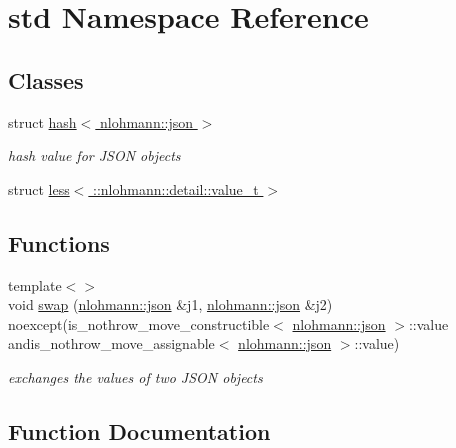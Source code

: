 \hypertarget{namespacestd}{}\section{std Namespace Reference}
\label{namespacestd}
\subsection*{Classes}
\begin{DoxyCompactItemize}
\item 
struct \hyperlink{structstd_1_1hash_3_01nlohmann_1_1json_01_4}{hash$<$ nlohmann\+::json $>$}
\begin{DoxyCompactList}\small\item\em hash value for J\+S\+ON objects \end{DoxyCompactList}\item 
struct \hyperlink{structstd_1_1less_3_01_1_1nlohmann_1_1detail_1_1value__t_01_4}{less$<$ \+::nlohmann\+::detail\+::value\+\_\+t $>$}
\end{DoxyCompactItemize}
\subsection*{Functions}
\begin{DoxyCompactItemize}
\item 
{\footnotesize template$<$$>$ }\\void \hyperlink{namespacestd_a248fd91b080106301215d145dd58cd9d}{swap} (\hyperlink{namespacenlohmann_a2bfd99e845a2e5cd90aeaf1b1431f474}{nlohmann\+::json} \&j1, \hyperlink{namespacenlohmann_a2bfd99e845a2e5cd90aeaf1b1431f474}{nlohmann\+::json} \&j2) noexcept(is\+\_\+nothrow\+\_\+move\+\_\+constructible$<$ \hyperlink{namespacenlohmann_a2bfd99e845a2e5cd90aeaf1b1431f474}{nlohmann\+::json} $>$\+::value andis\+\_\+nothrow\+\_\+move\+\_\+assignable$<$ \hyperlink{namespacenlohmann_a2bfd99e845a2e5cd90aeaf1b1431f474}{nlohmann\+::json} $>$\+::value)
\begin{DoxyCompactList}\small\item\em exchanges the values of two J\+S\+ON objects \end{DoxyCompactList}\end{DoxyCompactItemize}


\subsection{Function Documentation}
